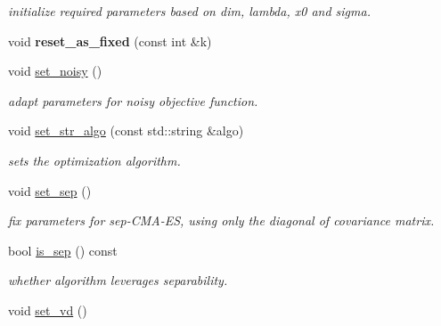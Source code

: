 \begin{DoxyCompactItemize}
\begin{DoxyCompactList}\small\item\em initialize required parameters based on dim, lambda, x0 and sigma. \end{DoxyCompactList}\item 
\hypertarget{classlibcmaes_1_1CMAParameters_aaa8bf42c3ba2a0f2aa0c2878fa0c1d82}{void {\bfseries reset\-\_\-as\-\_\-fixed} (const int \&k)}\label{classlibcmaes_1_1CMAParameters_aaa8bf42c3ba2a0f2aa0c2878fa0c1d82}

\item 
\hypertarget{classlibcmaes_1_1CMAParameters_aa6dc1bafcff83e082db9146a923949d3}{void \hyperlink{classlibcmaes_1_1CMAParameters_aa6dc1bafcff83e082db9146a923949d3}{set\-\_\-noisy} ()}\label{classlibcmaes_1_1CMAParameters_aa6dc1bafcff83e082db9146a923949d3}

\begin{DoxyCompactList}\small\item\em adapt parameters for noisy objective function. \end{DoxyCompactList}\item 
void \hyperlink{classlibcmaes_1_1CMAParameters_aa4cfa45b55bbebb90b316af6d613900c}{set\-\_\-str\-\_\-algo} (const std\-::string \&algo)
\begin{DoxyCompactList}\small\item\em sets the optimization algorithm. \end{DoxyCompactList}\item 
\hypertarget{classlibcmaes_1_1CMAParameters_a1f2115c14728278a946c358d8d26f30c}{void \hyperlink{classlibcmaes_1_1CMAParameters_a1f2115c14728278a946c358d8d26f30c}{set\-\_\-sep} ()}\label{classlibcmaes_1_1CMAParameters_a1f2115c14728278a946c358d8d26f30c}

\begin{DoxyCompactList}\small\item\em fix parameters for sep-\/\-C\-M\-A-\/\-E\-S, using only the diagonal of covariance matrix. \end{DoxyCompactList}\item 
bool \hyperlink{classlibcmaes_1_1CMAParameters_acf7d4eeada5c0ddc16f46d8788777737}{is\-\_\-sep} () const 
\begin{DoxyCompactList}\small\item\em whether algorithm leverages separability. \end{DoxyCompactList}\item 
\hypertarget{classlibcmaes_1_1CMAParameters_a49e06e1f62b551db3bc8d8e6e21ea9c2}{void \hyperlink{classlibcmaes_1_1CMAParameters_a49e06e1f62b551db3bc8d8e6e21ea9c2}{set\-\_\-vd} ()}\label{classlibcmaes_1_1CMAParameters_a49e06e1f62b551db3bc8d8e6e21ea9c2}


\end{DoxyCompactItemize}
